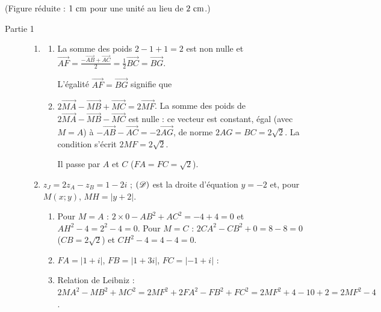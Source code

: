 (Figure réduite : $1~\mathrm{cm}$ pour une unité au lieu de $2~\mathrm{cm}$.)
\begin{description}
	\item[Partie 1]
	\begin{enumerate}
		\item
		\begin{enumerate}
			\item {}
				La somme des poids $2 - 1 + 1 = 2$ est non nulle et
				$\overrightarrow{AF} = \frac{-\overrightarrow{AB} + \overrightarrow{AC}}{2} = \frac{1}{2}\overrightarrow{BC} = \overrightarrow{BG}$.
				\par\noindent{}
				L'égalité $\overrightarrow{AF} = \overrightarrow{BG}$ signifie que \par\noindent{}
			\item {}
				$2\overrightarrow{MA} - \overrightarrow{MB} + \overrightarrow{MC} = 2\overrightarrow{MF}$.
				La somme des poids de $2\overrightarrow{MA} - \overrightarrow{MB} - \overrightarrow{MC}$ est nulle : ce vecteur est constant,
				égal (avec $M = A$) à $-\overrightarrow{AB} - \overrightarrow{AC} = -2\overrightarrow{AG}$, de norme $2AG = BC = 2\sqrt{2}$.
				La condition s'écrit $2MF = 2\sqrt{2}$.
				\par\noindent{}
				Il passe par $A$ et $C$ ($FA = FC = \sqrt{2}$).
		\end{enumerate}
		\item $z_J = 2z_A - z_B = 1 - 2i$ ; $(\mathscr{D})$ est la droite d'équation $y = -2$ et, pour $M(x;y)$, $MH = |y + 2|$.
		\begin{enumerate}
			\item {}
				Pour $M = A$ : $2 \times 0 - AB^2 + AC^2 = -4 + 4 = 0$ et $AH^2 - 4 = 2^2 - 4 = 0$.
				Pour $M = C$ : $2CA^2 - CB^2 + 0 = 8 - 8 = 0$ ($CB = 2\sqrt{2}$) et $CH^2 - 4 = 4 - 4 = 0$.
				\par\noindent{}
			\item {}
				$FA = |1 + i|$, $FB = |1 + 3i|$, $FC = |-1 + i|$ :
				\par\noindent{}
			\item {}
				Relation de Leibniz : $2MA^2 - MB^2 + MC^2 = 2MF^2 + 2FA^2 - FB^2 + FC^2 = 2MF^2 + 4 - 10 + 2 = 2MF^2 - 4$.

\end{enumerate}
\end{enumerate}
\end{description}
